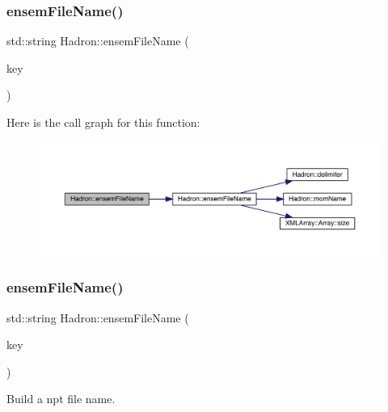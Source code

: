 \subsubsection{\texorpdfstring{ensemFileName()}{ensemFileName()}\hspace{0.1cm}{\footnotesize\ttfamily [7/12]}}
{\footnotesize\ttfamily std\+::string Hadron\+::ensem\+File\+Name (\begin{DoxyParamCaption}\item[{const \mbox{\hyperlink{structHadron_1_1KeyHadronNPartNPtCorr__t_1_1NPoint__t}{Hadron\+::\+Key\+Hadron\+N\+Part\+N\+Pt\+Corr\+\_\+t\+::\+N\+Point\+\_\+t}} \&}]{key }\end{DoxyParamCaption})}

Here is the call graph for this function\+:\nopagebreak
\begin{figure}[H]
\begin{center}
\leavevmode
\includegraphics[width=350pt]{d1/daf/namespaceHadron_ac1f8513c22ed958fc79537d0cfc00e1f_cgraph}
\end{center}
\end{figure}
\mbox{\label{namespaceHadron_a8e1d2864f30c4b930840948366f8f356}} 
\subsubsection{\texorpdfstring{ensemFileName()}{ensemFileName()}\hspace{0.1cm}{\footnotesize\ttfamily [8/12]}}
{\footnotesize\ttfamily std\+::string Hadron\+::ensem\+File\+Name (\begin{DoxyParamCaption}\item[{const \mbox{\hyperlink{structHadron_1_1KeyHadronNPartNPtCorr__t}{Hadron\+::\+Key\+Hadron\+N\+Part\+N\+Pt\+Corr\+\_\+t}} \&}]{key }\end{DoxyParamCaption})}



Build a npt file name. 

